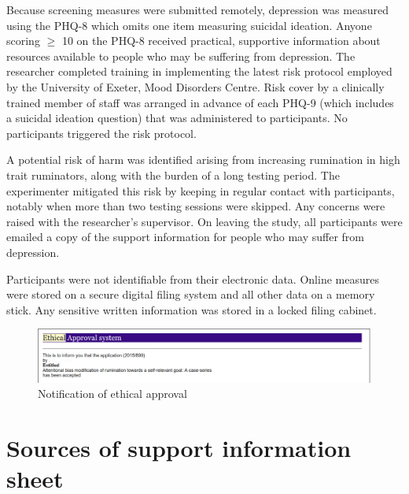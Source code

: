 \documentclass[man,floatsintext,a4paper,biblatex]{apa6}\usepackage[]{graphicx}\usepackage[]{color}
\begin{document}
Because screening measures were submitted remotely, depression was
measured using the PHQ-8 which omits one item measuring suicidal ideation.
Anyone scoring ${\geq}$ 10 on the PHQ-8 \parencite{kroenke_phq8_2009}
received practical, supportive information about resources available
to people who may be suffering from depression. The researcher
completed training in implementing the latest risk protocol employed
by the University of Exeter, Mood Disorders Centre. Risk cover by a
clinically trained member of staff was arranged in advance of each PHQ-9
(which includes a suicidal ideation question) that was administered to
participants. No participants triggered the risk protocol.

A potential risk of harm was identified arising from increasing
rumination in high trait ruminators, along with the burden of a long
testing period. The experimenter mitigated this risk by keeping in
regular contact with participants, notably when more than two testing
sessions were skipped. Any concerns were raised with the researcher's
supervisor. On leaving the study, all participants were emailed a copy
of the support information for people who may suffer from depression.

Participants were not identifiable from their electronic data. Online
measures were stored on a secure digital filing system and all other
data on a memory stick. Any sensitive written information was stored
in a locked filing cabinet.

\begin{figure}[hp]
\includegraphics[width=160mm]{figure/ethics_approval.png}
\caption{Notification of ethical approval}
\end{figure}

\section{Sources of support information sheet}
\label{app:support}

\end{document}
